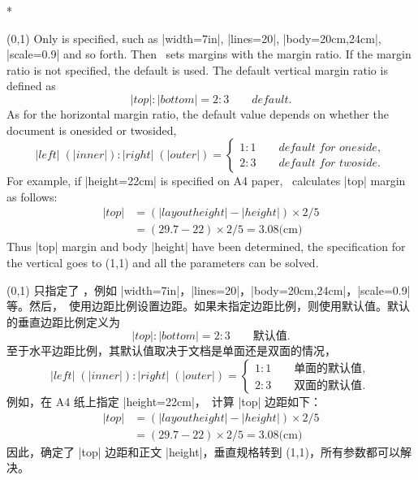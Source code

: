 \begin{Spec}
\begin{paracol}{2}
\switchcolumn[0]*\item[\Ss(0,1)]
 Only  is specified, such as |width=7in|, |lines=20|,
 |body={20cm,24cm}|, |scale=0.9| and so forth.
 Then \Gm\ sets margins with the margin ratio.
 If the margin ratio is not specified, the default is used.
 The default vertical margin ratio is defined as
 \begin{equation}
  |top| : |bottom| = 2 : 3 \qquad\textit{default}.
 \end{equation}
 As for the horizontal margin ratio, the default value depends on
 whether the document is onesided or twosided,
 \begin{equation}
  |left|\;(|inner|) : |right|\;(|outer|) 
       = \left\{ \begin{array}{ll}
              1 : 1 \qquad\textit{default for oneside},\\
              2 : 3 \qquad\textit{default for twoside}.
         \end{array}\right.
 \end{equation}
 For example, if |height=22cm| is specified on A4 paper, 
 \Gm\ calculates |top| margin as follows:
 \begin{equation}
   \begin{array}{ll}
   |top| &= ( |layoutheight| - |height| ) \times 2/5 \\
         &= (29.7-22)\times2/5 = 3.08\textrm{(cm)}
   \end{array}
 \end{equation}
 Thus |top| margin and body |height| have been determined, the
 specification for the vertical goes to \Ss(1,1) and
 all the parameters can be solved.
 \bigskip
 \switchcolumn
 \item[\Ss(0,1)]
 只指定了 ，例如 |width=7in|，|lines=20|，|body={20cm,24cm}|，|scale=0.9| 等。然后，\Gm\ 使用边距比例设置边距。如果未指定边距比例，则使用默认值。默认的垂直边距比例定义为
 \begin{equation}
  |top| : |bottom| = 2 : 3 \qquad\textit{默认值}.
 \end{equation}
 至于水平边距比例，其默认值取决于文档是单面还是双面的情况，
 \begin{equation}
  |left|\;(|inner|) : |right|\;(|outer|) 
       = \left\{ \begin{array}{ll}
              1 : 1 \qquad\textit{单面的默认值},\\
              2 : 3 \qquad\textit{双面的默认值}.
         \end{array}\right.
 \end{equation}
 例如，在 A4 纸上指定 |height=22cm|，\Gm\ 计算 |top| 边距如下：
 \begin{equation}
   \begin{array}{ll}
   |top| &= ( |layoutheight| - |height| ) \times 2/5 \\
         &= (29.7-22)\times2/5 = 3.08\textrm{(cm)}
   \end{array}
 \end{equation}
 因此，确定了 |top| 边距和正文 |height|，垂直规格转到 \Ss(1,1)，所有参数都可以解决。
 \bigskip


\end{paracol}
\end{Spec}
